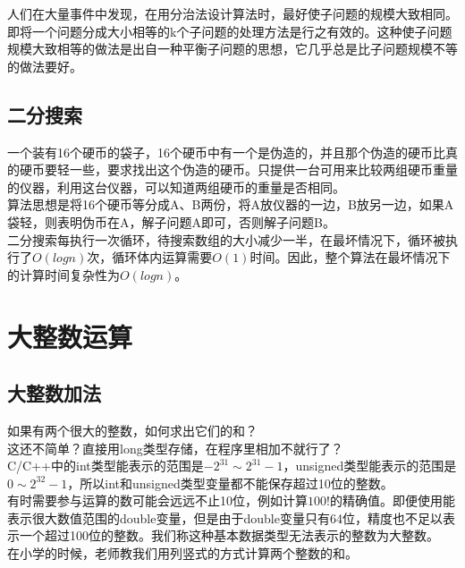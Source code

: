 人们在大量事件中发现，在用分治法设计算法时，最好使子问题的规模大致相同。即将一个问题分成大小相等的k个子问题的处理方法是行之有效的。这种使子问题规模大致相等的做法是出自一种平衡子问题的思想，它几乎总是比子问题规模不等的做法要好。\\

\subsection{二分搜索}

一个装有16个硬币的袋子，16个硬币中有一个是伪造的，并且那个伪造的硬币比真的硬币要轻一些，要求找出这个伪造的硬币。只提供一台可用来比较两组硬币重量的仪器，利用这台仪器，可以知道两组硬币的重量是否相同。\\

算法思想是将16个硬币等分成A、B两份，将A放仪器的一边，B放另一边，如果A袋轻，则表明伪币在A，解子问题A即可，否则解子问题B。\\

二分搜索每执行一次循环，待搜索数组的大小减少一半，在最坏情况下，循环被执行了$ O(logn) $次，循环体内运算需要$ O(1) $时间。因此，整个算法在最坏情况下的计算时间复杂性为$ O(logn) $。

\newpage

\section{大整数运算}

\subsection{大整数加法}

如果有两个很大的整数，如何求出它们的和？\\

这还不简单？直接用long类型存储，在程序里相加不就行了？\\

C/C++中的int类型能表示的范围是$ -2^{31} \sim 2^{31} - 1 $，unsigned类型能表示的范围是$ 0 \sim 2^{32} - 1 $，所以int和unsigned类型变量都不能保存超过10位的整数。\\

有时需要参与运算的数可能会远远不止10位，例如计算$ 100! $的精确值。即便使用能表示很大数值范围的double变量，但是由于double变量只有64位，精度也不足以表示一个超过100位的整数。我们称这种基本数据类型无法表示的整数为大整数。\\

在小学的时候，老师教我们用列竖式的方式计算两个整数的和。

